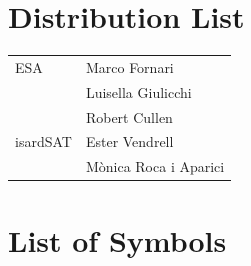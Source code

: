 \documentclass[11pt,a4paper]{article}
\begin{document}
\section*{Distribution List}
%

\begin{table}[ht!]
     \centering 
\begin{tabular}{|m{}|m{}|}
  \hline
  \cellcolor{dark_red} \color{white}{\bf Company } & \cellcolor{dark_red} \color{white}{\bf Name} \\
  \hline
    ESA & Marco Fornari \\
        & Luisella Giulicchi \\
     & Robert Cullen \\
    \hline
    isardSAT & Ester Vendrell \\
    & M\`onica Roca i Aparici \\

    \hline
\end{tabular}
\end{table}


\clearpage
\newpage

\begin{footnotesize}
\tableofcontents
\end{footnotesize}

\clearpage
\newpage
%

\listoffigures


\clearpage
\newpage
{}%

\listoftables


\clearpage
\newpage
\section*{List of Symbols}
%
\end{document}
